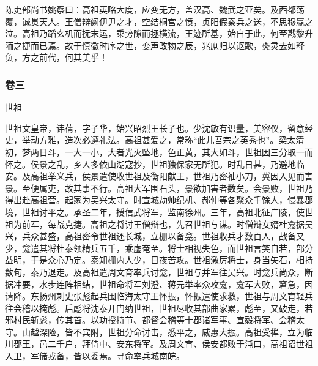 \documentclass[]{article}
\begin{document}
陈吏部尚书姚察曰：高祖英略大度，应变无方，盖汉高、魏武之亚矣。及西都荡覆，诚贯天人。王僧辩阙伊尹之才，空结桐宫之愤，贞阳假秦兵之送，不思穆嬴之泣。高祖乃蹈玄机而抚末运，乘势隙而拯横流，王迹所基，始自于此，何至戡黎升陑之捷而已焉。故于慎徽时序之世，变声改物之辰，兆庶归以讴歌，炎灵去如释负，方之前代，何其美乎！

\hypertarget{header-n4203}{%
\subsubsection{卷三}\label{header-n4203}}

世祖

世祖文皇帝，讳蒨，字子华，始兴昭烈王长子也。少沈敏有识量，美容仪，留意经史，举动方雅，造次必遵礼法。高祖甚爱之，常称``此儿吾宗之英秀也''。梁太清初，梦两日斗，一大一小，大者光灭坠地，色正黄，其大如斗，世祖因三分取一而怀之。侯景之乱，乡人多依山湖寇抄，世祖独保家无所犯。时乱日甚，乃避地临安。及高祖举义兵，侯景遣使收世祖及衡阳献王，世祖乃密袖小刀，冀因入见而害景。至便属吏，故其事不行。高祖大军围石头，景欲加害者数矣。会景败，世祖乃得出赴高祖营。起家为吴兴太守。时宣城劫帅纪机、郝仲等各聚众千馀人，侵暴郡境，世祖讨平之。承圣二年，授信武将军，监南徐州。三年，高祖北征广陵，使世祖为前军，每战克捷。高祖之将讨王僧辩也，先召世祖与谋。时僧辩女婿杜龛据吴兴，兵众甚盛，高祖密令世祖还长城，立栅以备龛。世祖收兵才数百人，战备又少，龛遣其将杜泰领精兵五千，乘虚奄至。将士相视失色，而世祖言笑自若，部分益明，于是众心乃定。泰知栅内人少，日夜苦攻。世祖激厉将士，身当矢石，相持数旬，泰乃退走。及高祖遣周文育率兵讨龛，世祖与并军往吴兴。时龛兵尚众，断据冲要，水步连阵相结，世祖命将军刘澄、蒋元举率众攻龛，龛军大败，窘急，因请降。东扬州刺史张彪起兵围临海太守王怀振，怀振遣使求救，世祖与周文育轻兵往会稽以掩彪。后彪将沈泰开门纳世祖，世祖尽收其部曲家累，彪至，又破走，若邪村民斩彪，传其首。以功授持节、都督会稽等十郡诸军事、宣毅将军、会稽太守。山越深险，皆不宾附，世祖分命讨击，悉平之，威惠大振。高祖受禅，立为临川郡王，邑二千户，拜侍中、安东将军。及周文育、侯安都败于沌口，高祖诏世祖入卫，军储戎备，皆以委焉。寻命率兵城南皖。
\end{document}
